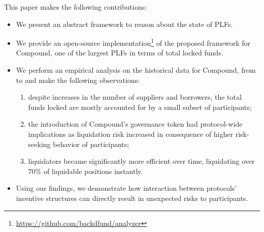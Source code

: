  This paper makes the following contributions:
\begin{itemize}
    \item We present an abstract framework to reason about the state of PLFs.
    
    \item We provide an open-source implementation\footnote{\url{https://github.com/backdfund/analyzer}} of the proposed framework for Compound, one of the largest PLFs in terms of total locked funds.
    
    \item We perform an empirical analysis on the historical data for Compound, from \StartDate to \EndDate and make the following observations:
    \begin{enumerate}%
    \item despite increases in the number of suppliers and borrowers, the total funds locked are mostly accounted for by a small subset of participants; 
    \item the introduction of Compound's governance token had protocol-wide implications as liquidation risk increased in consequence of higher risk-seeking behavior of participants;
    \item liquidators became significantly more efficient over time, liquidating over 70\% of liquidable positions instantly.
    \end{enumerate}
    
    \item Using our findings, we demonstrate how interaction between protocols' incentive structures can directly result in unexpected risks to participants.
\end{itemize}
